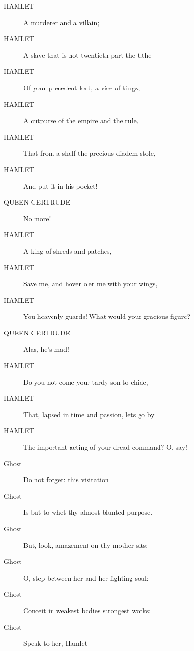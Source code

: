\documentclass{article}
\begin{document}
\begin{description}
            
\item[HAMLET] A murderer and a villain;
\item[HAMLET] A slave that is not twentieth part the tithe
\item[HAMLET] Of your precedent lord; a vice of kings;
\item[HAMLET] A cutpurse of the empire and the rule,
\item[HAMLET] That from a shelf the precious diadem stole,
\item[HAMLET] And put it in his pocket!
\end{description}
          
\begin{description}
            
\item[QUEEN GERTRUDE] No more!
\end{description}
          
\begin{description}
            
\item[HAMLET] A king of shreds and patches,--
\item[HAMLET] Save me, and hover o'er me with your wings,
\item[HAMLET] You heavenly guards! What would your gracious figure?
\end{description}
          
\begin{description}
            
\item[QUEEN GERTRUDE] Alas, he's mad!
\end{description}
          
\begin{description}
            
\item[HAMLET] Do you not come your tardy son to chide,
\item[HAMLET] That, lapsed in time and passion, lets go by
\item[HAMLET] The important acting of your dread command? O, say!
\end{description}
          
\begin{description}
            
\item[Ghost] Do not forget: this visitation
\item[Ghost] Is but to whet thy almost blunted purpose.
\item[Ghost] But, look, amazement on thy mother sits:
\item[Ghost] O, step between her and her fighting soul:
\item[Ghost] Conceit in weakest bodies strongest works:
\item[Ghost] Speak to her, Hamlet.
\end{description}
          
\end{document}
